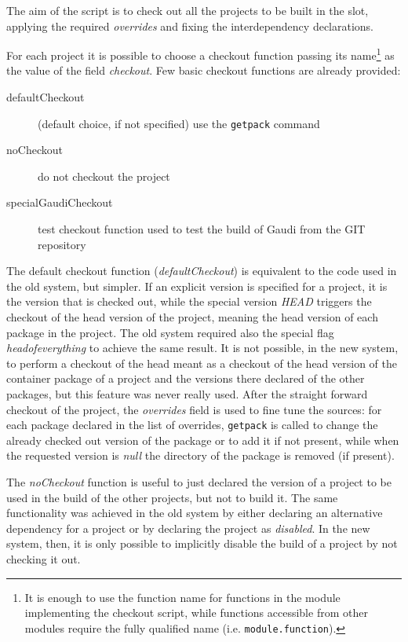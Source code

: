 The aim of the script is to check out all the projects to be built in the slot,
applying the required \emph{overrides} and fixing the interdependency
declarations.

For each project it is possible to choose a checkout function passing its
name\footnote{It is enough to use the function name for functions in the module
implementing the checkout script, while functions accessible from other modules
require the fully qualified name (i.e. \texttt{module.function}).} as the value
of the field \emph{checkout}.  Few basic checkout functions are already
provided:
\begin{description}
  \item[defaultCheckout] (default choice, if not specified) use the
\texttt{getpack} command
  \item[noCheckout] do not checkout the project
  \item[specialGaudiCheckout] test checkout function used to test the build of
  Gaudi from the GIT repository
\end{description}

The default checkout function (\emph{defaultCheckout}) is equivalent to the code
used in the old system, but simpler.  If an explicit version is specified for a
project, it is the version that is checked out, while the special version
\emph{HEAD} triggers the checkout of the head version of the project, meaning
the head version of each package in the project.  The old system required also
the special flag \emph{headofeverything} to achieve the same result.  It is not
possible, in the new system, to perform a checkout of the head meant as a
checkout of the head version of the container package of a project and the
versions there declared of the other packages, but this feature was never really
used.  After the straight forward checkout of the project, the \emph{overrides}
field is used to fine tune the sources: for each package declared in the list of
overrides, \texttt{getpack} is called to change the already checked out version
of the package or to add it if not present, while when the requested version is
\emph{null} the directory of the package is removed (if present).

The \emph{noCheckout} function is useful to just declared the version of a
project to be used in the build of the other projects, but not to build it.  The
same functionality was achieved in the old system by either declaring an
alternative dependency for a project or by declaring the project as
\emph{disabled}.  In the new system, then, it is only possible to implicitly
disable the build of a project by not checking it out.

